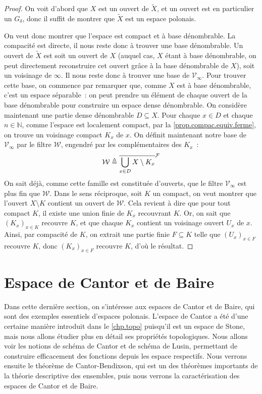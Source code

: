 \begin{proof}
  On voit d'abord que $X$ est un ouvert de $\tilde X$, et un ouvert est en
  particulier un $G_\delta$, donc il suffit de montrer que $\tilde X$ est un
  espace polonais.

  On veut donc montrer que l'espace est compact et à base dénombrable. La
  compacité est directe, il nous reste donc à trouver une base dénombrable. Un
  ouvert de $\tilde X$ est soit un ouvert de $X$ (auquel cas, $X$ étant à base
  dénombrable, on peut directement reconstruire cet ouvert grâce à la base
  dénombrable de $X$), soit un voisinage de $\infty$. Il nous reste donc à
  trouver une base de $\mathcal V_\infty$. Pour trouver cette base, on commence
  par remarquer que, comme $X$ est à base dénombrable, c'est un espace
  séparable~: on peut prendre un élément de chaque ouvert de la base dénombrable
  pour construire un espace dense dénombrable. On considère maintenant une
  partie dense dénombrable $D \subseteq X$. Pour chaque $x \in D$ et chaque
  $n \in \mathbb N$, comme l'espace est localement compact, par la
  \cref{prop.compac.equiv.ferme}, on trouve un voisinage compact $K_x$ de
  $x$. On définit maintenant notre base de $\mathcal V_\infty$ par le filtre
  $\mathcal W$, engendré par les complémentaires des $K_x$~:
  \[\mathcal W \triangleq \overline{\bigcup_{x \in D} X\setminus K_{x}}^{\mathcal F}\]
  On sait déjà, comme cette famille est constituée d'ouverts, que le filtre
  $\mathcal V_\infty$ est plus fin que $\mathcal W$. Dans le sens réciproque,
  soit $K$ un compact, on veut montrer que l'ouvert $X\setminus K$ contient un
  ouvert de $\mathcal W$. Cela revient à dire que pour tout compact $K$, il
  existe une union finie de $K_x$ recouvrant $K$. Or, on sait que
  $(K_x)_{x \in K}$ recouvre $K$, et que chaque $K_x$ contient un voisinage
  ouvert $U_x$ de $x$. Ainsi, par compacité de $K$, on extrait une partie finie
  $F\subseteq K$ telle que $(U_x)_{x \in F}$ recouvre $K$, donc $(K_x)_{x \in F}$
  recouvre $K$, d'où le résultat.
\end{proof}

\section{Espace de Cantor et de Baire}

Dans cette dernière section, on s'intéresse aux espaces de Cantor et de Baire,
qui sont des exemples essentiels d'espaces polonais. L'espace de Cantor a été
d'une certaine manière introduit dans le \cref{chp.topo} puisqu'il est un espace
de Stone, mais nous allons étudier plus en détail ses propriétés topologiques.
Nous allons voir les notions de schéma de Cantor et de schéma de Lusin,
permettant de construire efficacement des fonctions depuis les espace
respectifs. Nous verrons ensuite le théorème de Cantor-Bendixson, qui est un des
théorèmes importants de la théorie descriptive des ensembles, puis nous verrons
la caractérisation des espaces de Cantor et de Baire.

